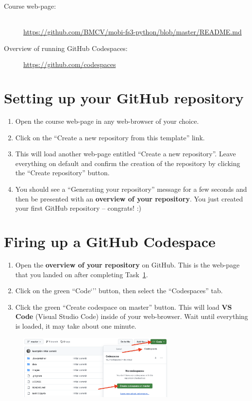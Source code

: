 \documentclass[12pt,a4paper]{article}
\begin{document}
\begin{description}
\item[Course web-page:]~\\\url{https://github.com/BMCV/mobi-fs3-python/blob/master/README.md}
\item[Overview of running GitHub Codespaces:] \url{https://github.com/codespaces}
\end{description}

\section{Setting up your GitHub repository}
\label{task:preparation}
\begin{enumerate}
\item Open the course web-page in any web-browser of your choice.
\item Click on the ``Create a new repository from this template'' link.
\item This will load another web-page entitled ``Create a new repository''. Leave everything on default and confirm the creation of the repository by clicking the ``Create repository'' button.
\item You should see a ``Generating your repository'' message for a few seconds and then be presented with an \textbf{overview of your repository}. You just created your first GitHub repository -- congrats! :)
\end{enumerate}

\section{Firing up a GitHub Codespace}
\label{task:codespaces}
\begin{enumerate}
\item Open the \textbf{overview of your repository} on GitHub. This is the web-page that you landed on after completing Task~\ref{task:preparation}.
\item Click on the green ``Code`'' button, then select the ``Codespaces'' tab.
\item Click the green ``Create codespace on master'' button. This will load \textbf{VS Code} (Visual Studio Code) inside of your web-browser. Wait until everything is loaded, it may take about one minute.
\end{enumerate}

\begin{figure}[h!]
    \centering
    \includegraphics[width=0.7\textwidth]{images/codespaces.png}
\end{figure}
\end{document}

